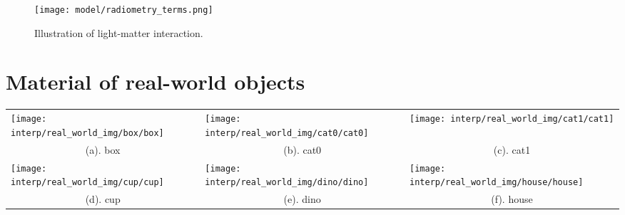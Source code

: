 \begin{figure}[!htbp]
\centering
\texttt{[image: model/radiometry\_terms.png]}
\caption{Illustration of light-matter interaction.}
\label{fig:radiometry_terms}
\end{figure}

\section{Material of real-world objects}
\label{sec:real_world_dataset}
\begin{table}[!hbtp]
  \centering
  \begin{tabular}{*{9}{c}}
  \multicolumn{3}{l}{\texttt{[image: interp/real\_world\_img/box/box]}} &
  \multicolumn{3}{l}{\texttt{[image: interp/real\_world\_img/cat0/cat0]}} &
  \multicolumn{3}{l}{\texttt{[image: interp/real\_world\_img/cat1/cat1]}}\\
  \multicolumn{3}{c}{(a). box} & \multicolumn{3}{c}{(b). cat0} & \multicolumn{3}{c}{(c). cat1} \\
  \multicolumn{3}{l}{\texttt{[image: interp/real\_world\_img/cup/cup]}} &
  \multicolumn{3}{l}{\texttt{[image: interp/real\_world\_img/dino/dino]}} &
  \multicolumn{3}{l}{\texttt{[image: interp/real\_world\_img/house/house]}}\\
  \multicolumn{3}{c}{(d). cup} & \multicolumn{3}{c}{(e). dino} & \multicolumn{3}{c}{(f). house} \\

\end{tabular}
\end{table}
